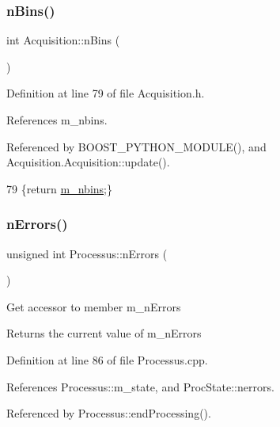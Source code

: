 \subsubsection{\texorpdfstring{n\+Bins()}{nBins()}\hspace{0.1cm}{\footnotesize\ttfamily [2/2]}}
{\footnotesize\ttfamily int Acquisition\+::n\+Bins (\begin{DoxyParamCaption}{ }\end{DoxyParamCaption})\hspace{0.3cm}{\ttfamily [inline]}}



Definition at line 79 of file Acquisition.\+h.



References m\+\_\+nbins.



Referenced by B\+O\+O\+S\+T\+\_\+\+P\+Y\+T\+H\+O\+N\+\_\+\+M\+O\+D\+U\+L\+E(), and Acquisition.\+Acquisition\+::update().


\begin{DoxyCode}
79 \{\textcolor{keywordflow}{return} \hyperlink{classAcquisition_a05bccdc4b9ada37beaeba8794ccef12d}{m\_nbins};\}
\end{DoxyCode}
\mbox{\label{classProcessus_a82a0487f82f07cc2c2dc2731f98149e7}} 
\subsubsection{\texorpdfstring{n\+Errors()}{nErrors()}}
{\footnotesize\ttfamily unsigned int Processus\+::n\+Errors (\begin{DoxyParamCaption}{ }\end{DoxyParamCaption})\hspace{0.3cm}{\ttfamily [inherited]}}

Get accessor to member m\+\_\+n\+Errors \begin{DoxyReturn}{Returns}
the current value of m\+\_\+n\+Errors 
\end{DoxyReturn}


Definition at line 86 of file Processus.\+cpp.



References Processus\+::m\+\_\+state, and Proc\+State\+::nerrors.



Referenced by Processus\+::end\+Processing().


